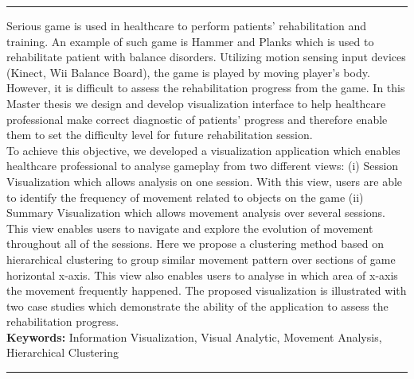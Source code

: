\documentclass[a4paper,11pt,twoside]{ThesisStyle}
\begin{document}
\let\cleardoublepage\clearpage 



\begin{vcenterpage}
\noindent\rule[2pt]{\textwidth}{0.5pt}

Serious game is used in healthcare to perform patients' rehabilitation and training. An example of such game is Hammer and Planks which is used to rehabilitate patient with balance disorders. Utilizing motion sensing input devices (Kinect, Wii Balance Board), the game is played by moving player's body. However, it is difficult to assess the rehabilitation progress from the game. In this Master thesis we design and develop visualization interface to help healthcare professional make correct diagnostic of patients' progress and therefore enable them to set the difficulty level for future rehabilitation session.
\\
To achieve this objective, we developed a visualization application which enables healthcare professional to analyse gameplay from two different views: (i) Session Visualization which allows analysis on one session. With this view, users are able to identify the frequency of movement related to objects on the game (ii) Summary Visualization which allows movement analysis over several sessions. This view enables users to navigate and explore the evolution of movement throughout all of the sessions. Here we propose a clustering method based on hierarchical clustering to group similar movement pattern over sections of game horizontal x-axis. This view also enables users to analyse in which area of x-axis the movement frequently happened. The proposed visualization is illustrated with two case studies which demonstrate the ability of the application to assess the rehabilitation progress.
\\
{\large\textbf{Keywords:}}
Information Visualization, Visual Analytic, Movement Analysis, Hierarchical Clustering
\\
\noindent\rule[2pt]{\textwidth}{0.5pt}
\end{vcenterpage}

\dominitoc
\end{document}
